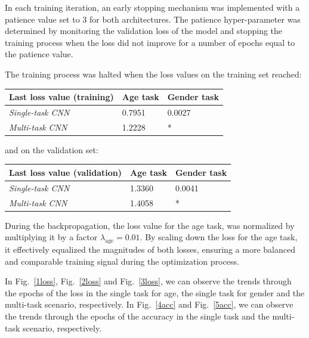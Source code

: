 In each training iteration, an early stopping mechanism was implemented with
a patience value set to 3 for both architectures.
The patience hyper-parameter was determined by monitoring the validation loss
of the model and stopping the training process when the loss
did not improve for a number of epochs equal to the patience value.

The training process was halted when the loss values
on the training set reached: 
\begin{table}[H]
    \centering
    \begin{tabular}{@{}lll@{}}
    \toprule
    Last loss value (training) & \textbf{Age task} & \textbf{Gender task} \\ \midrule
    \textit{Single-task CNN} &  0.7951           & 0.0027               \\
    \textit{Multi-task CNN}  &  1.2228           & *                    \\ \bottomrule
    \end{tabular}
\end{table}
and on the validation set:
\begin{table}[H]
    \centering
    \begin{tabular}{@{}lll@{}}
    \toprule
    Last loss value (validation) & \textbf{Age task} & \textbf{Gender task} \\ \midrule
    \textit{Single-task CNN} &  1.3360           & 0.0041               \\
    \textit{Multi-task CNN}  &  1.4058           & *                    \\ \bottomrule
    \end{tabular}
\end{table}
During the backpropagation, the loss value for the age task, 
was normalized by multiplying it by a factor
$\lambda_{\text{age}} = 0.01$.
By scaling down the loss for the age task, it effectively equalized
the magnitudes of both losses, ensuring a more balanced and comparable
training signal during the optimization process. 

In Fig.~\ref{1loss}, Fig.~\ref{2loss} and Fig.~\ref{3loss},
we can observe the trends through the epochs
of the loss
in the single task for age, the single task for gender
and the multi-task scenario, respectively.
In Fig.~\ref{4acc} and Fig.~\ref{5acc}, we can observe the
trends through the epochs of the accuracy
in the single task
and the multi-task scenario, respectively.

